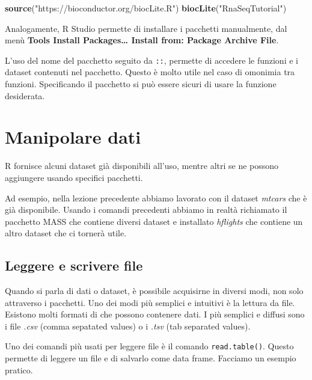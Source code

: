 \documentclass[]{book}
\newenvironment{Shaded}{\begin{snugshade}}{\end{snugshade}}
\newcommand{\KeywordTok}[1]{\textcolor[rgb]{0.13,0.29,0.53}{\textbf{#1}}}
\newcommand{\NormalTok}[1]{#1}
\newcommand{\StringTok}[1]{\textcolor[rgb]{0.31,0.60,0.02}{#1}}
\begin{document}
\begin{Shaded}
\begin{Highlighting}[]
\KeywordTok{source}\NormalTok{(}\StringTok{"https://bioconductor.org/biocLite.R"}\NormalTok{)}
\KeywordTok{biocLite}\NormalTok{(}\StringTok{"RnaSeqTutorial"}\NormalTok{)}
\end{Highlighting}
\end{Shaded}

Analogamente, R Studio permette di installare i pacchetti manualmente, dal menù \textbf{Tools \textbar{} Install Packages\ldots{} \textbar{} Install from: \textbar{} Package Archive File}.

L'uso del nome del pacchetto seguito da \texttt{::}, permette di accedere le funzioni e i dataset contenuti nel pacchetto. Questo è molto utile nel caso di omonimia tra funzioni. Specificando il pacchetto si può essere sicuri di usare la funzione desiderata.

\hypertarget{manipolare-dati}{%
\section{Manipolare dati}\label{manipolare-dati}}

R fornisce alcuni dataset già disponibili all'uso, mentre altri se ne possono aggiungere usando specifici pacchetti.

Ad esempio, nella lezione precedente abbiamo lavorato con il dataset \emph{mtcars} che è già disponibile. Usando i comandi precedenti abbiamo in realtà richiamato il pacchetto MASS che contiene diversi dataset e installato \emph{hflights} che contiene un altro dataset che ci tornerà utile.

\hypertarget{leggere-e-scrivere-file}{%
\subsection{Leggere e scrivere file}\label{leggere-e-scrivere-file}}

Quando si parla di dati o dataset, è possibile acquisirne in diversi modi, non solo attraverso i pacchetti. Uno dei modi più semplici e intuitivi è la lettura da file. Esistono molti formati di che possono contenere dati. I più semplici e diffusi sono i file \emph{.csv} (comma sepatated values) o i \emph{.tsv} (tab separated values).

Uno dei comandi più usati per leggere file è il comando \texttt{read.table()}. Questo permette di leggere un file e di salvarlo come data frame. Facciamo un esempio pratico.
\end{document}
